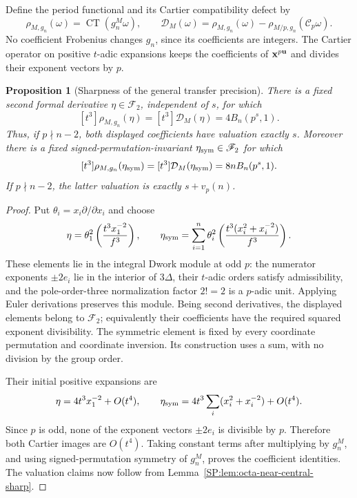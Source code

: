 \documentclass[11pt,a4paper]{article}
\newtheorem{proposition}[theorem]{Proposition}
\theoremstyle{definition}\newtheorem{definition}[theorem]{Definition}
\theoremstyle{remark}\newtheorem{remark}[theorem]{Remark}
\numberwithin{equation}{section}
\begin{document}
Define the period functional and its Cartier compatibility defect by
\[
 \rho_{M,g_n}(\omega)=\operatorname{CT}(g_n^M\omega),\qquad
 \mathcal D_M(\omega)=\rho_{M,g_n}(\omega)
       -\rho_{M/p,g_n}(\mathscr C_p\omega).
\]
No coefficient Frobenius changes $g_n$, since its coefficients are integers.
The Cartier operator on positive $t$-adic expansions keeps the coefficients
of ${\bf x}^{p\mathbf u}$ and divides their exponent vectors by $p$.

\begin{proposition}[Sharpness of the general transfer precision]
\label{SP:prop:period-functional-obstruction}
There is a fixed second formal derivative $\eta\in\mathscr F_2$,
independent of $s$, for which
\[
 [t^3]\rho_{M,g_n}(\eta)
 =[t^3]\mathcal D_M(\eta)=4B_n(p^s,1).
\]
Thus, if $p\nmid n-2$, both displayed coefficients have valuation exactly
$s$.  Moreover there is a fixed signed-permutation-invariant
$\eta_{\rm sym}\in\mathscr F_2$ for which
\[
 [t^3]\rho_{M,g_n}(\eta_{\rm sym})
 =[t^3]\mathcal D_M(\eta_{\rm sym})=8nB_n(p^s,1).
\]
If $p\nmid n-2$, the latter valuation is exactly $s+v_p(n)$.
\end{proposition}

\begin{proof}
Put $\theta_i=x_i\partial/\partial x_i$ and choose
\[
 \eta=\theta_1^2\left(\frac{t^3x_1^{-2}}{f^3}\right),\qquad
 \eta_{\rm sym}=\sum_{i=1}^n\theta_i^2
       \left(\frac{t^3(x_i^2+x_i^{-2})}{f^3}\right).
\]
These elements lie in the integral Dwork module at odd $p$: the
numerator exponents $\pm2e_i$ lie in the interior of $3\Delta$, their
$t$-adic orders satisfy admissibility, and the pole-order-three
normalization factor $2!=2$ is a $p$-adic unit.  Applying Euler
derivations preserves this module.  Being second derivatives, the
displayed elements belong to $\mathscr F_2$; equivalently their
coefficients have the required squared exponent divisibility.
The symmetric element is fixed by every coordinate permutation and
coordinate inversion.  Its construction uses a sum, with no division
by the group order.

Their initial positive expansions are
\[
 \eta=4t^3x_1^{-2}+O(t^4),\qquad
 \eta_{\rm sym}=4t^3\sum_i(x_i^2+x_i^{-2})+O(t^4).
\]
Since $p$ is odd, none of the exponent vectors $\pm2e_i$ is divisible
by $p$.  Therefore both Cartier images are $O(t^4)$.  Taking constant
terms after multiplying by $g_n^M$, and using signed-permutation
symmetry of $g_n^M$, proves the coefficient identities.  The valuation
claims now follow from Lemma~\ref{SP:lem:octa-near-central-sharp}.
\end{proof}
\end{document}
